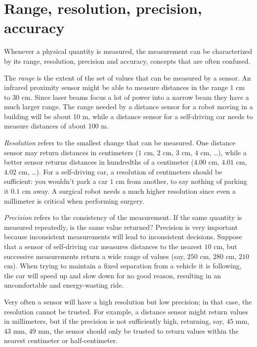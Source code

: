 \section{Range, resolution, precision, accuracy}\label{s.range}

Whenever a physical quantity is measured, the measurement can be characterized by its range, resolution, precision and accuracy, concepts that are often confused.

The \emph{range} is the extent of the set of values that can be measured by a sensor. An infrared proximity sensor might be able to measure distances in the range $1$ cm to $30$ cm. Since laser beams focus a lot of power into a narrow beam they have a much larger range. The range needed by a distance sensor for a robot moving in a building will be about 10 m, while a distance sensor for a self-driving car needs to measure distances of about 100 m.

\emph{Resolution} refers to the smallest change that can be measured. One distance sensor may return distances in centimeters ($1$ cm, $2$ cm, $3$ cm, $4$ cm, \ldots), while a better sensor returns distances in hundredths of a centimeter ($4.00$ cm, $4.01$ cm, $4.02$ cm, \ldots). For a self-driving car, a resolution of centimeters should be sufficient: you wouldn't park a car $1$ cm from another, to say nothing of parking it $0.1$ cm away. A surgical robot needs a much higher resolution since even a millimeter is critical when performing surgery.

\emph{Precision} refers to the consistency of the measurement. If the same quantity is measured repeatedly, is the same value returned? Precision is very important because inconsistent measurements will lead to inconsistent decisions. Suppose that a sensor of self-driving car measures distances to the nearest $10$ cm, but successive measurements return a wide range of values (say, $250$ cm, $280$ cm, $210$ cm). When trying to maintain a fixed separation from a vehicle it is following, the car will speed up and slow down for no good reason, resulting in an uncomfortable and energy-wasting ride.

Very often a sensor will have a high resolution but low precision; in that case, the resolution cannot be trusted. For example, a distance sensor might return values in millimeters, but if the precision is not sufficiently high, returning, say, $45$ mm, $43$ mm, $49$ mm, the sensor should only be trusted to return values within the nearest centimeter or half-centimeter.

